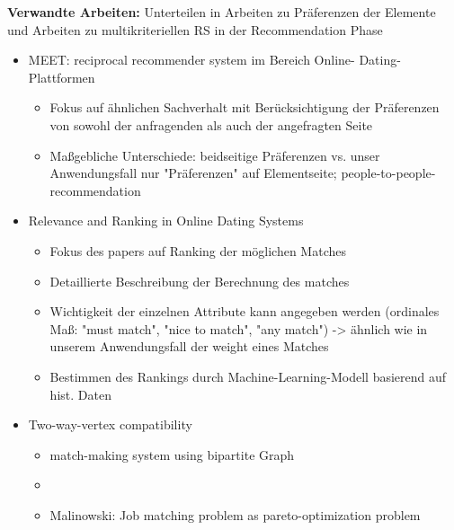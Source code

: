 \textbf{Verwandte Arbeiten:}
Unterteilen in Arbeiten zu Präferenzen der Elemente und Arbeiten zu multikriteriellen RS in der Recommendation Phase
\begin{itemize}
    \item MEET: reciprocal recommender system im Bereich Online- Dating- Plattformen %
    \begin{itemize}
        \item Fokus auf ähnlichen Sachverhalt mit Berücksichtigung der Präferenzen von sowohl der anfragenden als auch der angefragten Seite
        \item Maßgebliche Unterschiede: beidseitige Präferenzen vs. unser Anwendungsfall nur "Präferenzen" auf Elementseite; people-to-people-recommendation
    \end{itemize}
    \item Relevance and Ranking in Online Dating Systems %
    \begin{itemize}
        \item Fokus des papers auf Ranking der möglichen Matches
        \item Detaillierte Beschreibung der Berechnung des matches
        \item Wichtigkeit der einzelnen Attribute kann angegeben werden (ordinales Maß: "must match", "nice to match", "any match") -> ähnlich wie in unserem Anwendungsfall der weight eines Matches
        \item Bestimmen des Rankings durch Machine-Learning-Modell basierend auf hist. Daten
    \end{itemize}
    \item Two-way-vertex compatibility %
    \begin{itemize}
        \item match-making system using bipartite Graph
        \item 
    \end{itemize}
    \begin{itemize}
        \item Malinowski: Job matching problem as pareto-optimization problem %

\end{itemize}
\end{itemize}
